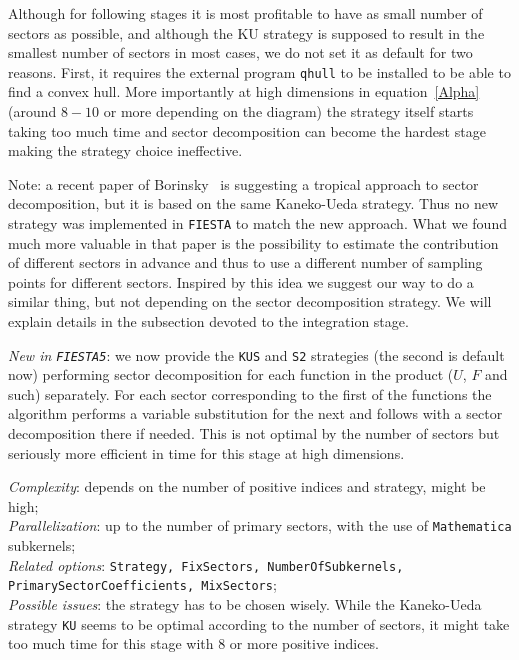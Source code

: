 \documentclass[preprint,12pt]{elsarticle}
\begin{document}
Although for following stages it is most profitable to have as small number of sectors as possible, and although the KU strategy is supposed to result in the smallest number of sectors in most cases, we do not set it as default for two reasons. First, it requires the external program {\tt qhull} to be installed to be able to find a convex hull. More importantly at high dimensions in equation~\ref{Alpha} (around $8-10$ or more depending on the diagram) the strategy itself starts taking too much time and sector decomposition can become the hardest stage making the strategy choice ineffective.

Note: a recent paper of Borinsky~\cite{Borinsky:2020rqs} is suggesting a tropical approach to sector decomposition, but it is based on the same Kaneko-Ueda strategy. Thus no new strategy was implemented in {\tt FIESTA} to match the new approach. What we found much more valuable in that paper is the possibility to estimate the contribution of  different sectors in advance and thus to use a different number of sampling points for different sectors. Inspired by this idea we suggest our way to do a similar thing, but not depending on the sector decomposition strategy. We will explain details in the subsection devoted to the integration stage.

\textit{New in {\tt FIESTA5}}: we now provide the {\tt KUS} and {\tt S2} strategies (the second is default now) performing sector decomposition for each function in the product ($U$, $F$ and such) separately. For each sector corresponding to the first of the functions the algorithm performs a variable substitution for the next and follows with a sector decomposition there if needed. This is not optimal by the number of sectors but seriously more efficient in time for this stage at high dimensions.

\textit{Complexity}: depends on the number of positive indices and strategy, might be high;\\\indent
\textit{Parallelization}: up to the number of primary sectors, with the use of {\tt Mathematica} subkernels;\\\indent
\textit{Related options}: {\tt Strategy, FixSectors, NumberOfSubkernels, \\ PrimarySectorCoefficients, MixSectors};\\\indent
\textit{Possible issues}: the strategy has to be chosen wisely. While the Kaneko-Ueda strategy {\tt KU} seems to be optimal according to the number of sectors, it might take too much time for this stage with $8$ or more positive indices.
\end{document}
